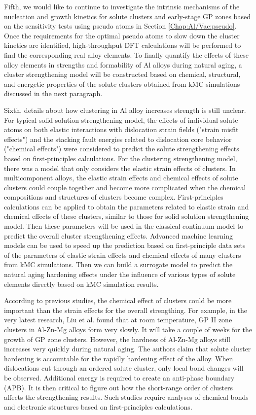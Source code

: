 Fifth, we would like to continue to investigate the intrinsic mechanisms of the nucleation and growth kinetics for solute clusters and early-stage GP zones based on the sensitivity tests using pseudo atoms in Section \ref{Chap:Al/Vac:pseudo}. Once the requirements for the optimal pseudo atoms to slow down the cluster kinetics are identified, high-throughput DFT calculations will be performed to find the corresponding real alloy elements. To finally quantify the effects of these alloy elements in strengths and formability of Al alloys during natural aging, a cluster strengthening model will be constructed based on chemical, structural, and energetic properties of the solute clusters obtained from \ac{kMC} simulations discussed in the next paragraph.

Sixth, details about how clustering in Al alloy increases strength is still unclear. For typical solid solution strengthening model, the effects of individual solute atoms on both elastic interactions with dislocation strain fields ("strain misfit effects") and the stacking fault energies related to dislocation core behavior ("chemical effects") were considered to predict the solute strengthening effects based on first-principles calculations\cite{yasi2010first}. For the clustering strengthening model, there was a model that only considers the elastic strain effects of clusters\cite{zhao2014cluster}. In multicomponent alloys, the elastic strain effects and chemical effects of solute clusters could couple together and become more complicated when the chemical compositions and structures of clusters become complex. First-principles calculations can be applied to obtain the parameters related to elastic strain and chemical effects of these clusters, similar to those for solid solution strengthening model\cite{yasi2010first}.  Then these parameters will be used in the classical continuum model to predict the overall cluster strengthening effects. Advanced machine learning models can be used to speed up the prediction based on first-principle data sets of the parameters of elastic strain effects and chemical effects of many clusters from \ac{kMC} simulations. Then we can build a surrogate model to predict the natural aging hardening effects under the influence of various types of solute elements directly based on \ac{kMC} simulation results.

According to previous studies, the chemical effect of clusters could be more important than the strain effects for the overall strengthing. For example, in the very latest research, Liu et al. \cite{liu2020formation} found that at room temperature, \ac{GP} II zone clusters in Al-Zn-Mg alloys form very slowly. It will take a couple of weeks for the growth of \ac{GP} zone clusters. However, the hardness of Al-Zn-Mg alloys still increases very quickly during natural aging. The authors claim that solute cluster hardening is accountable for the rapidly hardening effect of the alloy. When dislocations cut through an ordered solute cluster, only local bond changes will be observed. Additional energy is required to create an anti-phase boundary (APB). It is then critical to figure out how the short-range order of clusters affects the strengthening results.  Such studies require analyses of chemical bonds and electronic structures based on first-principles calculations. 